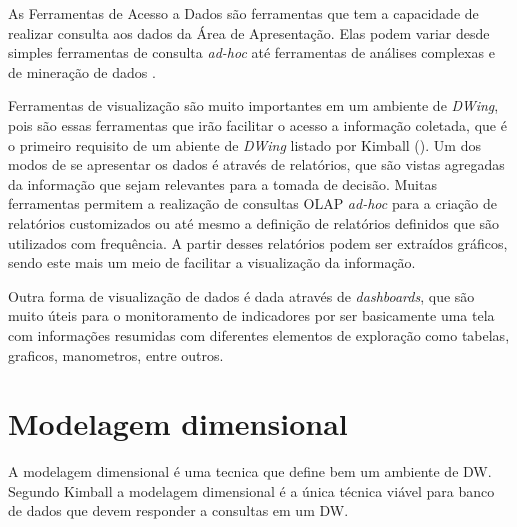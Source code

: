 As Ferramentas de Acesso a Dados são ferramentas que tem a capacidade de realizar consulta aos dados da Área de Apresentação. Elas podem variar desde simples ferramentas de consulta \emph{ad-hoc} até ferramentas de análises complexas e de mineração de dados \cite{kimball2002}.

Ferramentas de visualização são muito importantes em um ambiente de \emph{DWing}, pois são essas ferramentas que irão facilitar o acesso a informação coletada, que é o primeiro requisito de um abiente de \emph{DWing} listado por Kimball (\citeyear{kimball2002}). Um dos modos de se apresentar os dados é através de relatórios, que são vistas agregadas da informação que sejam relevantes para a tomada de decisão. Muitas ferramentas permitem a realização de consultas OLAP \emph{ad-hoc} para a criação de relatórios customizados ou até mesmo a definição de relatórios definidos que são utilizados com frequência. A partir desses relatórios podem ser extraídos gráficos, sendo este mais um meio de facilitar a visualização da informação. 

Outra forma de visualização de dados é dada através  de \emph{dashboards}, que são muito úteis para o monitoramento de indicadores por ser basicamente uma tela com informações resumidas com diferentes elementos de exploração como tabelas, graficos, manometros, entre outros.



\section{Modelagem dimensional}
\label{sec-dimensional-modeling}

A modelagem dimensional é uma tecnica que define bem um ambiente de DW. Segundo Kimball \citeyear{kimball2002} a modelagem dimensional é a única técnica viável para banco de dados  que devem responder a consultas em um DW.

